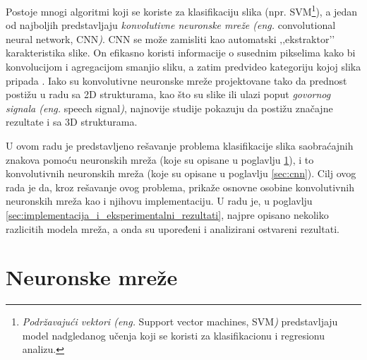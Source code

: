 \documentclass[a4paper]{article}
\begin{document}
Postoje mnogi algoritmi koji se koriste za klasifikaciju slika (npr. SVM\footnote{\textit{Podržavajući vektori (eng.} Support vector machines, SVM\textit{)} predstavljaju model nadgledanog učenja koji se koristi za klasifikacionu i regresionu analizu.}), a jedan od najboljih predstavljaju \textit{konvolutivne neuronske mreže (eng.} convolutional neural network, CNN\textit{)}. CNN se može zamisliti kao automatski ‚‚ekstraktor’’ karakteristika slike. On efikasno koristi informacije o susednim pikselima kako bi konvolucijom i agregacijom smanjio sliku, a zatim predvideo kategoriju kojoj slika pripada \cite{understandConvNet}. Iako su konvolutivne neuronske mreže projektovane tako da prednost postižu u radu sa 2D strukturama, kao što su slike ili ulazi poput \textit{govornog signala (eng.} speech signal\textit{)}, najnovije studije pokazuju da postižu značajne rezultate i sa 3D strukturama.

U ovom radu je predstavljeno rešavanje problema klasifikacije slika saobraćajnih znakova pomoću neuronskih mreža (koje su opisane u poglavlju \ref{sec:neuronske_mreze}), i to konvolutivnih neuronskih mreža (koje su opisane u poglavlju \ref{sec:cnn}). Cilj ovog rada je da, kroz rešavanje ovog problema, prikaže osnovne osobine konvolutivnih neuronskih mreža kao i njihovu implementaciju. U radu je, u poglavlju \ref{sec:implementacija_i_eksperimentalni_rezultati}, najpre opisano nekoliko razlicitih modela mreža, a onda su upoređeni i analizirani ostvareni rezultati.



\newpage

\section{Neuronske mreže}
\label{sec:neuronske_mreze}
\end{document}
